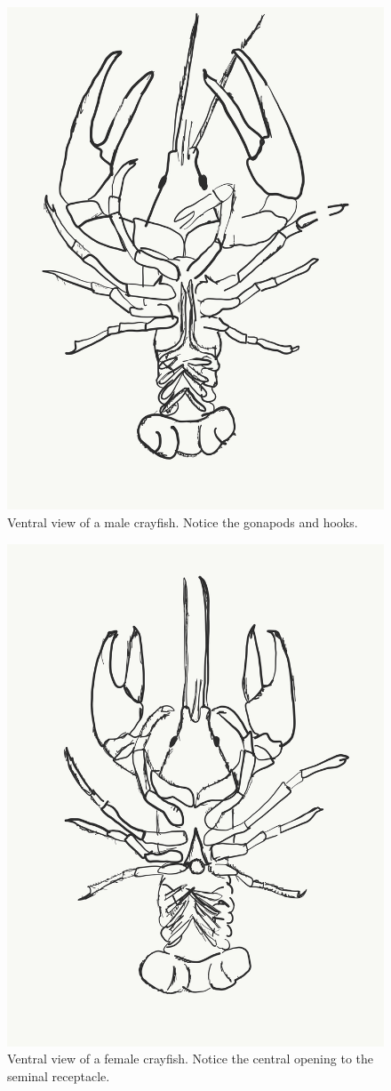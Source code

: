 \begin{figure}

{\centering \includegraphics[width=0.7\linewidth]{./figures/nematoda/male_crayfish}

}

\caption{Ventral view of a male crayfish. Notice the gonapods and hooks.}\label{fig:malecray}
\end{figure}

\begin{figure}

{\centering \includegraphics[width=0.7\linewidth]{./figures/nematoda/female_crayfish}

}

\caption{Ventral view of a female crayfish. Notice the central opening to the seminal receptacle.}\label{fig:femalecray}
\end{figure}

